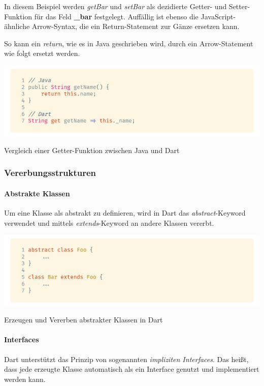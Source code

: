 In diesem Beispiel werden \textit{getBar} und \textit{setBar} als dezidierte Getter- und Setter-Funktion für das Feld \textbf{\_bar} festgelegt. Auffällig ist ebenso die JavaScript-ähnliche Arrow-Syntax, die ein Return-Statement zur Gänze ersetzen kann.

So kann ein \textit{return}, wie es in Java geschrieben wird, durch ein Arrow-Statement wie folgt
ersetzt werden.

\begin{code}[h]
    \centering
    \includegraphics[width=1\textwidth]{images/Dart/theory/dartVSJavaGetter.png}
    \vspace{-25pt}
    \caption{Vergleich einer Getter-Funktion zwischen Java und Dart}
\end{code}

\subsubsection{Vererbungsstrukturen}

\paragraph{Abstrakte Klassen}


Um eine Klasse als abstrakt zu definieren, wird in Dart das \textit{abstract}-Keyword verwendet und mittels
\textit{extends}-Keyword an andere Klassen vererbt.

\begin{code}[h]
    \centering
    \includegraphics[width=1\textwidth]{images/Dart/theory/dartAbstractClass.png}
    \vspace{-25pt}
    \caption{Erzeugen und Vererben abstrakter Klassen in Dart}
\end{code}

\paragraph{Interfaces}
 

Dart unterstützt das Prinzip von sogenannten \textit{impliziten Interfaces}. Das heißt, dass jede erzeugte Klasse automatisch als ein Interface genutzt und implementiert werden kann.
